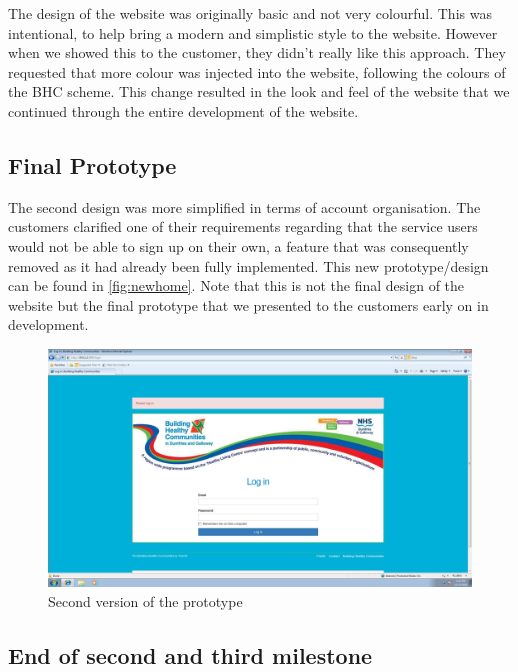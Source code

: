 \documentclass{l3proj}
\begin{document}
The design of the website was originally basic and not very colourful. This was intentional, to help bring a modern and simplistic style to the website. However when we showed this to the customer, they didn't really like this approach. They requested that more colour was injected into the website, following the colours of the BHC scheme. This change resulted in the look and feel of the website that we continued through the entire development of the website.

\subsection{Final Prototype}
\label{sec:prototype2}

The second design was more simplified in terms of account organisation. The customers clarified one of their requirements regarding that the service users would not be able to sign up on their own, a feature that was consequently removed as it had already been fully implemented. This new prototype/design can be found in \autoref{fig:newhome}. Note that this is not the final design of the website but the final prototype that we presented to the customers early on in development.


\begin{figure}[ht]
\centerline{\includegraphics[width=\textwidth, height=\textheight, keepaspectratio]{newhome.png}}
\caption{Second version of the prototype}
\label{fig:newhome}
\end{figure}

\subsection{End of second and third milestone}
\label{sec:milestone23}
\end{document}
